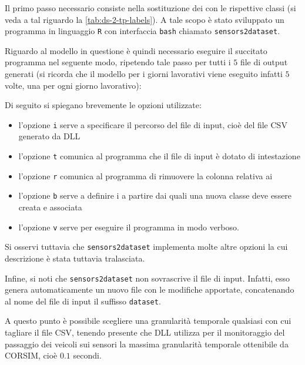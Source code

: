 Il primo passo necessario consiste nella sostituzione dei \emph{} con le rispettive classi (si veda a tal riguardo la \vref{tab:ds-2-tp-labels}). A tale scopo è stato sviluppato un programma in linguaggio \lstinline[]|R| con interfaccia \lstinline[]|bash| chiamato \lstinline[]|sensors2dataset|.

Riguardo al modello in questione è quindi necessario eseguire il succitato programma nel seguente modo, ripetendo tale passo per tutti i $5$ file di output generati (si ricorda che il modello per i giorni lavorativi viene eseguito infatti $5$ volte, una per ogni giorno lavorativo):

\vspace*{8pt}
Di seguito si spiegano brevemente le opzioni utilizzate:
\begin{itemize}
	\item l'opzione \lstinline[]|i| serve a specificare il percorso del file di input, cioè del file \acs{CSV} generato da  \acs{DLL}
	\item l'opzione \lstinline[]|t| comunica al programma che il file di input è dotato di intestazione
	\item l'opzione \lstinline[]|r| comunica al programma di rimuovere la colonna relativa ai \emph{}
	\item l'opzione \lstinline[]|b| serve a definire i \emph{} a partire dai quali una nuova classe deve essere creata e associata
	\item l'opzione \lstinline[]|v| serve per eseguire il programma in modo verboso.
\end{itemize}
Si osservi tuttavia che \lstinline[]|sensors2dataset| implementa molte altre opzioni la cui descrizione è stata tuttavia tralasciata.

Infine, si noti che \lstinline[]|sensors2dataset| non sovrascrive il file di input. Infatti, esso genera automaticamente un nuovo file con le modifiche apportate, concatenando al nome del file di input il suffisso \lstinline[]|dataset|.

A questo punto è possibile scegliere una granularità temporale qualsiasi con cui tagliare il file \acs{CSV}, tenendo presente che  \acs{DLL} utilizza per il monitoraggio del passaggio dei veicoli sui sensori la massima granularità temporale ottenibile da \acs{CORSIM}, cioè $0.1$ secondi.

